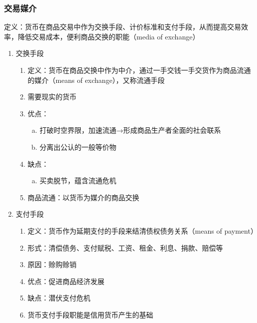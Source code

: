 \documentclass[12pt]{book}
\begin{document}
\subsubsection{交易媒介}

定义：货币在商品交易中作为交换手段、计价标准和支付手段，从而提高交易效率，降低交易成本，便利商品交换的职能（media of exchange）



\begin{enumerate}[1.]
    \item 交换手段
          \begin{enumerate}[(1)]
              \item 定义：货币在商品交换中作为中介，通过一手交钱一手交货作为商品流通的媒介（means of exchange），又称流通手段
              \item 需要现实的货币
              \item 优点：
                    \begin{enumerate}[a.]
                        \item 打破时空界限，加速流通→形成商品生产者全面的社会联系
                        \item 分离出公认的一般等价物
                    \end{enumerate}
              \item 缺点：
                    \begin{enumerate}[a.]
                        \item  买卖脱节，蕴含流通危机
                    \end{enumerate}
              \item 商品流通：以货币为媒介的商品交换
          \end{enumerate}
    \item 支付手段
          \begin{enumerate}[(1)]
              \item 定义：货币作为延期支付的手段来结清债权债务关系（means of payment）
              \item 形式：清偿债务、支付赋税、工资、租金、利息、捐款、赔偿等
              \item 原因：赊购赊销
              \item 优点：促进商品经济发展
              \item 缺点：潜伏支付危机
              \item 货币支付手段职能是信用货币产生的基础
          \end{enumerate}
\end{enumerate}
\end{document}

